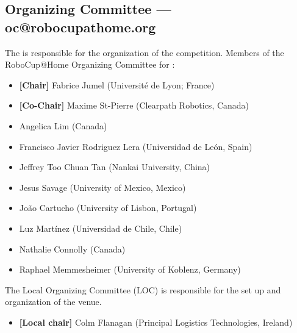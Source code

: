 \subsection{Organizing Committee --- oc@robocupathome.org}
\label{sec:oc}
The  is responsible for the organization of the competition. Members of the RoboCup@Home Organizing Committee for \YEAR:

\begin{itemize}
	\item \textbf{[Chair]} Fabrice Jumel (Université de Lyon; France)
	\item \textbf{[Co-Chair]} Maxime St-Pierre (Clearpath Robotics, Canada)
	\item Angelica Lim (Canada)
	\item Francisco Javier Rodriguez Lera (Universidad de León, Spain)
	\item Jeffrey Too Chuan Tan (Nankai University, China)
	\item Jesus Savage (University of Mexico, Mexico)
	\item João Cartucho (University of Lisbon, Portugal)
	\item Luz Martínez (Universidad de Chile, Chile)
	\item Nathalie Connolly (Canada)
	\item Raphael Memmesheimer (University of Koblenz, Germany)
\end{itemize}

The Local Organizing Committee (LOC) is responsible for the set up and organization of the venue.
\begin{itemize}
	\item \textbf{[Local chair]} Colm Flanagan (Principal Logistics Technologies, Ireland)
\end{itemize}
